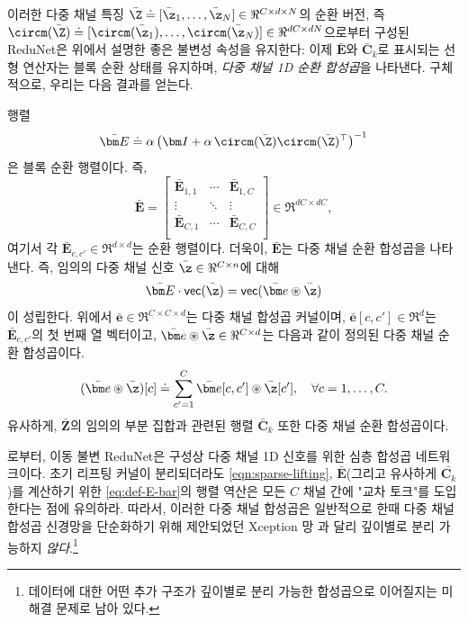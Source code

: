 \documentclass[../../book-main_ko.tex]{subfiles}
\begin{document}
이러한 다중 채널 특징 $\bar\Z \doteq [\bar \z_1, \ldots, \bar \z_N] \in \Re^{C \times d \times N}$의 순환 버전, 즉 $\circm(\bar\Z) \doteq [ \circm(\bar\z_1), \dots, \circm(\bar\z_N)] \in \Re^{dC \times dN}$으로부터 구성된 ReduNet은 위에서 설명한 좋은 불변성 속성을 유지한다: 이제 $\bar{\bm E}$와 $\bar{\bm C}_k$로 표시되는 선형 연산자는 블록 순환 상태를 유지하며, {\em 다중 채널 1D 순환 합성곱}을 나타낸다.
구체적으로, 우리는 다음 결과를 얻는다.
\begin{proposition}
행렬
\begin{equation}
\label{eq:def-E-bar}
\bar{\bm E} \doteq \alpha\left(\bm I + \alpha\, \circm(\bar\Z) \circm(\bar\Z)^\top \right) ^{-1}  
\end{equation}
은 블록 순환 행렬이다. 즉,
\begin{equation*}
    \bar{\bm E} = 
    \left[\begin{matrix}
        \bar{\bm E}_{1, 1} & \cdots & \bar{\bm E}_{1, C}\\
        \vdots & \ddots & \vdots \\
        \bar{\bm E}_{C, 1} & \cdots & \bar{\bm E}_{C, C}\\
    \end{matrix}\right] \in \Re^{dC \times dC},
\end{equation*}
여기서 각 $\bar{\bm E}_{c, c'}\in \Re^{d \times d}$는 순환 행렬이다. 더욱이, $\bar{\bm E}$는 다중 채널 순환 합성곱을 나타낸다. 즉, 임의의 다중 채널 신호 $\bar\z \in \Re^{C \times n}$에 대해
$$\bar{\bm E} \cdot \textsf{vec}(\bar\z) = \textsf{vec}( \bar{\bm e} \circledast \bar\z)$$ 
이 성립한다. 위에서 $\bar{\bm e} \in \Re^{C \times C \times d}$는 다중 채널 합성곱 커널이며, $\bar{\bm e}[c, c'] \in \Re^{d}$는 $\bar{\bm E}_{c, c'}$의 첫 번째 열 벡터이고, $\bar{\bm e} \circledast \bar\z \in \Re^{C \times d}$는 다음과 같이 정의된 다중 채널 순환 합성곱이다.
\begin{equation*}
    (\bar{\bm e} \circledast \bar\z)[c] \doteq \sum_{c'=1}^C \bar{\bm e}[c, c'] \circledast \bar{\z}[c'], \quad \forall c = 1, \ldots, C.
\end{equation*}
유사하게, $\bar{\bm Z}$의 임의의 부분 집합과 관련된 행렬 $\bar{\bm C}_k$ 또한 다중 채널 순환 합성곱이다.
\label{prop:multichannel-circular-conv-1}
\end{proposition}
로부터, 이동 불변 ReduNet은 구성상 다중 채널 1D 신호를 위한 심층 합성곱 네트워크이다. 초기 리프팅 커널이 분리되더라도 \eqref{eqn:sparse-lifting}, $\bar{\bm E}$(그리고 유사하게 $\bar{\bm C_k}$)를 계산하기 위한 \eqref{eq:def-E-bar}의 행렬 역산은 모든 $C$ 채널 간에 "교차 토크"를 도입한다는 점에 유의하라. %
따라서, 이러한 다중 채널 합성곱은 일반적으로 한때 다중 채널 합성곱 신경망을 단순화하기 위해 제안되었던 Xception 망 \cite{Xception}과 달리 깊이별로 분리 가능하지 {\em 않다}.\footnote{데이터에 대한 어떤 추가 구조가 깊이별로 분리 가능한 합성곱으로 이어질지는 미해결 문제로 남아 있다.}
\end{document}
